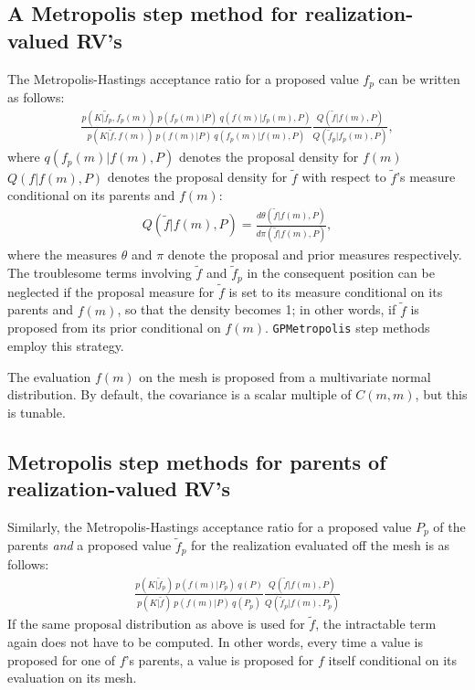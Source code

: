\documentclass{report}
\begin{document}
\subsection{A Metropolis step method for realization-valued RV's} 
The Metropolis-Hastings acceptance ratio for a proposed value $f_p$ can be written as follows:
\begin{eqnarray*}
    \frac{p(K|\tilde f_p, f_p(m))\ p(f_p(m) | P)\ q(f(m)|f_p(m),P)}{p(K|\tilde f, f(m))\ p(f(m) | P)\ q(f_p(m)|f(m),P)} \frac{Q(\tilde f|f(m),P)}{Q(\tilde f_p|f_p(m), P)} ,
\end{eqnarray*}
where $q(f_p(m)|f(m),P)$ denotes the proposal density for $f(m)$ $Q(f|f(m), P)$ denotes the proposal density for $\tilde f$ with respect to $\tilde f$'s measure conditional on its parents and $f(m)$:
\begin{eqnarray*}
    Q(\tilde f|f(m),P) = \frac{d\theta(\tilde f|f(m),P)}{d\pi(\tilde f|f(m),P)},
\end{eqnarray*}
where the measures $\theta$ and $\pi$ denote the proposal and prior measures respectively. The troublesome terms involving $\tilde f$ and $\tilde f_p$ in the consequent position can be neglected if the proposal measure for $\tilde f$ is set to its measure conditional on its parents and $f(m)$, so that the density becomes 1; in other words, if $\tilde f$ is proposed from its prior conditional on $f(m)$. \texttt{GPMetropolis} step methods employ this strategy.

The evaluation $f(m)$ on the mesh is proposed from a multivariate normal distribution. By default, the covariance is a scalar multiple of $C(m,m)$, but this is tunable.

\subsection{Metropolis step methods for parents of realization-valued RV's} 
Similarly, the Metropolis-Hastings acceptance ratio for a proposed value $P_p$ of the parents \emph{and} a proposed value $\tilde f_p$ for the realization evaluated off the mesh is as follows:
\begin{eqnarray*}
    \frac{p(K|\tilde f_p)\ p(f(m) | P_p)\ q(P)}{p(K|\tilde f)\ p(f(m) | P)\ q(P_p)} \frac{Q(\tilde f|f(m),P)}{Q(\tilde f_p|f(m), P_p)}
\end{eqnarray*}
If the same proposal distribution as above is used for $\tilde f$, the intractable term again does not have to be computed. In other words, every time a value is proposed for one of $f$'s parents, a value is proposed for $f$ itself conditional on its evaluation on its mesh. 
\end{document}
